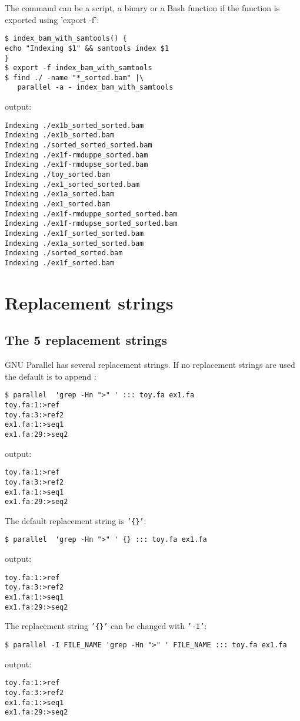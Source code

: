\documentclass{article}
\begin{document}
The command can be a script, a binary or a Bash function if the function is exported using 'export -f':
\begin{lstlisting}
$ index_bam_with_samtools() {
echo "Indexing $1" && samtools index $1
}
$ export -f index_bam_with_samtools
$ find ./ -name "*_sorted.bam" |\
   parallel -a - index_bam_with_samtools
\end{lstlisting}
output:
\begin{lstlisting}
Indexing ./ex1b_sorted_sorted.bam
Indexing ./ex1b_sorted.bam
Indexing ./sorted_sorted_sorted.bam
Indexing ./ex1f-rmduppe_sorted.bam
Indexing ./ex1f-rmdupse_sorted.bam
Indexing ./toy_sorted.bam
Indexing ./ex1_sorted_sorted.bam
Indexing ./ex1a_sorted.bam
Indexing ./ex1_sorted.bam
Indexing ./ex1f-rmduppe_sorted_sorted.bam
Indexing ./ex1f-rmdupse_sorted_sorted.bam
Indexing ./ex1f_sorted_sorted.bam
Indexing ./ex1a_sorted_sorted.bam
Indexing ./sorted_sorted.bam
Indexing ./ex1f_sorted.bam
\end{lstlisting}

\section{Replacement strings}
\subsection{The 5 replacement strings}
GNU Parallel has several replacement strings. If no replacement strings are used the default is to append {}:
\begin{lstlisting}
$ parallel  'grep -Hn ">" ' ::: toy.fa ex1.fa
toy.fa:1:>ref
toy.fa:3:>ref2
ex1.fa:1:>seq1
ex1.fa:29:>seq2
\end{lstlisting}
output:
\begin{lstlisting}
toy.fa:1:>ref
toy.fa:3:>ref2
ex1.fa:1:>seq1
ex1.fa:29:>seq2
\end{lstlisting}

The default replacement string is \texttt{'\{\}'}:
\begin{lstlisting}
$ parallel  'grep -Hn ">" ' {} ::: toy.fa ex1.fa
\end{lstlisting}
output:
\begin{lstlisting}
toy.fa:1:>ref
toy.fa:3:>ref2
ex1.fa:1:>seq1
ex1.fa:29:>seq2
\end{lstlisting}

The replacement string \texttt{'\{\}'} can be changed with \texttt{'-I'}:
\begin{lstlisting}
$ parallel -I FILE_NAME 'grep -Hn ">" ' FILE_NAME ::: toy.fa ex1.fa
\end{lstlisting}
output:
\begin{lstlisting}
toy.fa:1:>ref
toy.fa:3:>ref2
ex1.fa:1:>seq1
ex1.fa:29:>seq2
\end{lstlisting}
\end{document}
